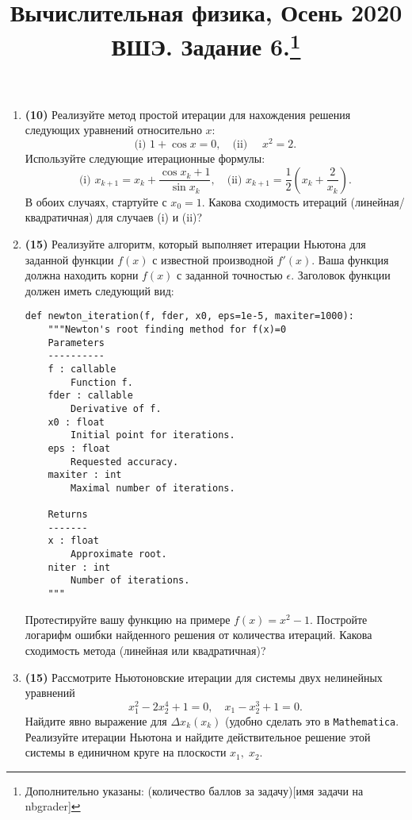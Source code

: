 \documentclass[prb,papersize=a4paper,notitlepage]{revtex4-1}%
\newcommand{\wm}[1]{\texttt{Mathematica}}
\begin{document}
\title{Вычислительная физика, Осень 2020 ВШЭ. Задание 6.\footnote{Дополнительно указаны: (количество баллов за задачу)[имя задачи на nbgrader]}}
\maketitle
\begin{enumerate}

\item \textbf{(10)}
Реализуйте метод простой итерации для нахождения решения следующих уравнений относительно $x$:
$$
\textrm{(i) }1+\cos x = 0,\quad\textrm{(ii) }\quad x^2 = 2.
$$
Используйте следующие итерационные формулы:
$$
\textrm{(i) }x_{k+1}=x_k+\frac{\cos x_k + 1}{\sin x_k},\quad\textrm{(ii) }x_{k+1}=\frac{1}{2}\left(x_k+\frac{2}{x_k}\right).
$$
В обоих случаях, стартуйте с $x_0=1$. Какова сходимость итераций (линейная/квадратичная) для случаев (i) и (ii)?

\item \textbf{(15)}
Реализуйте алгоритм, который выполняет итерации Ньютона для заданной функции $f(x)$ с известной производной $f'(x)$. Ваша функция должна находить корни $f(x)$ с заданной точностью $\epsilon$. Заголовок функции должен иметь следующий вид:
\lstset{language=Python}
\lstset{frame=lines}
\lstset{basicstyle=\ttfamily}
\begin{lstlisting}
def newton_iteration(f, fder, x0, eps=1e-5, maxiter=1000):
    """Newton's root finding method for f(x)=0
    Parameters
    ----------
    f : callable
        Function f.
    fder : callable
        Derivative of f.
    x0 : float
        Initial point for iterations.
    eps : float
        Requested accuracy.
    maxiter : int
        Maximal number of iterations.
    
    Returns
    -------
    x : float
        Approximate root.
    niter : int
        Number of iterations.
    """
\end{lstlisting}
Протестируйте вашу функцию на примере $f(x)=x^2-1$. Постройте логарифм ошибки найденного решения от количества итераций. Какова сходимость метода (линейная или квадратичная)?

\item \textbf{(15)}
Рассмотрите Ньютоновские итерации для системы двух нелинейных уравнений 
$$
x_1^2-2x_2^4+1=0,\quad x_1-x_2^3+1=0.
$$
Найдите явно выражение для $\Delta x_k(x_k)$ (удобно сделать это в \wm). Реализуйте итерации Ньютона и найдите действительное решение этой системы в единичном круге на плоскости $x_1,\;x_2$.


\end{enumerate}
\end{document}
